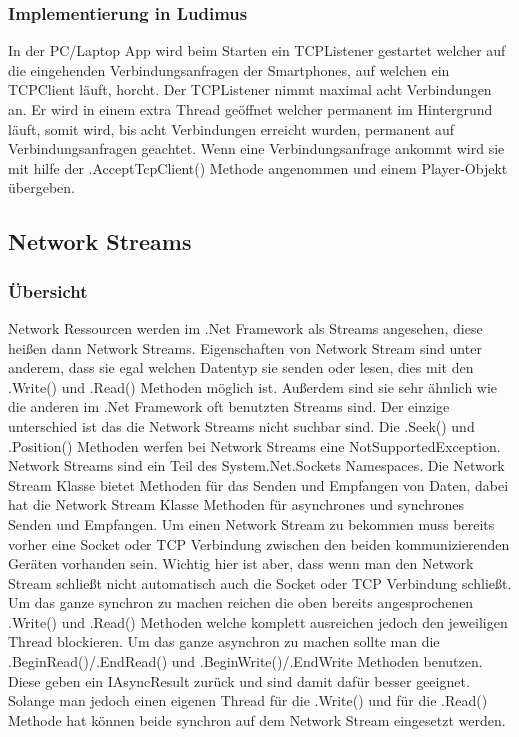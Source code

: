 \subsubsection{Implementierung in Ludimus}
In der PC/Laptop App wird beim Starten ein TCPListener gestartet welcher auf die eingehenden Verbindungsanfragen der Smartphones, auf welchen ein TCPClient läuft, horcht. Der TCPListener nimmt maximal acht Verbindungen an. Er wird in einem extra Thread geöffnet welcher permanent im Hintergrund läuft, somit wird, bis acht Verbindungen erreicht wurden, permanent auf Verbindungsanfragen geachtet. Wenn eine Verbindungsanfrage ankommt wird sie mit hilfe der .AcceptTcpClient() Methode angenommen und einem Player-Objekt übergeben.
\subsection{Network Streams}
\subsubsection{Übersicht}
Network Ressourcen werden im .Net Framework als Streams angesehen, diese heißen dann Network Streams. Eigenschaften von Network Stream sind unter anderem, dass sie egal welchen Datentyp sie senden oder lesen, dies mit den .Write() und .Read() Methoden möglich ist. Außerdem sind sie sehr ähnlich wie die anderen im .Net Framework oft benutzten Streams sind. Der einzige unterschied ist das die Network Streams nicht suchbar sind. Die .Seek() und .Position() Methoden werfen bei Network Streams eine NotSupportedException. Network Streams sind ein Teil des System.Net.Sockets Namespaces. Die Network Stream Klasse bietet Methoden für das Senden und Empfangen von Daten, dabei hat die Network Stream Klasse Methoden für asynchrones und synchrones Senden und Empfangen. Um einen Network Stream zu bekommen muss bereits vorher eine Socket oder TCP Verbindung zwischen den beiden kommunizierenden Geräten vorhanden sein. Wichtig hier ist aber, dass wenn man den Network Stream schließt nicht automatisch auch die Socket oder TCP Verbindung schließt. Um das ganze synchron zu machen reichen die oben bereits angesprochenen .Write() und .Read() Methoden welche komplett ausreichen jedoch den jeweiligen Thread blockieren. Um das ganze asynchron zu machen sollte man die .BeginRead()/.EndRead() und .BeginWrite()/.EndWrite Methoden benutzen. Diese geben ein IAsyncResult zurück und sind damit dafür besser geeignet. Solange man jedoch einen eigenen Thread für die .Write() und für die .Read() Methode hat können beide synchron auf dem Network Stream eingesetzt werden. 
